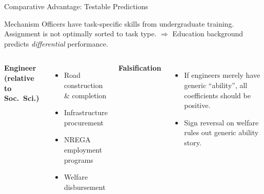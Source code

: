 \documentclass[aspectratio=169,10pt]{beamer}
\begin{document}
\begin{frame}{Comparative Advantage: Testable Predictions}
  \begin{block}{Mechanism}
    Officers have task-specific skills from undergraduate training.
    Assignment is not optimally sorted to task type.
    $\Rightarrow$ Education background predicts \emph{differential} performance.
  \end{block}
  \vspace{8pt}
  \begin{columns}[T]
    \textbf{Engineer (relative to Soc.\ Sci.)}\\[4pt]
    \begin{itemize}
      \item[\color{iasblue}$+$] Road construction \& completion
      \item[\color{iasblue}$+$] Infrastructure procurement
      \item[\color{iasred}$-$] NREGA employment programs
      \item[\color{iasred}$-$] Welfare disbursement
    \end{itemize}
    \textbf{Falsification}\\[4pt]
    \begin{itemize}
      \item If engineers merely have generic ``ability'', all coefficients
            should be positive.
      \item Sign reversal on welfare rules out generic ability story.
    \end{itemize}
  \end{columns}
\end{frame}
\end{document}
